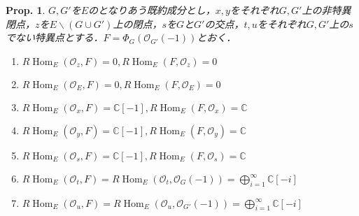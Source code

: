 \documentclass[uplatex,a4paper,11pt,dvipdfmx]{jsarticle}
\theoremstyle{mystyle} %
\newtheorem{proposition}[theorem]{Prop.}
\DeclareMathOperator{\Hom}{Hom}
\begin{document}
\begin{proposition}
	$G, G'$を$E$のとなりあう既約成分とし，$x,y$をそれぞれ$G, G'$上の非特異閉点，$z$を$E \backslash (G \cup G')$上の閉点，$s$を$G$と$G'$の交点，$t, u$をそれぞれ$G, G'$上の$s$でない特異点とする．$F = \Phi_G(\mathcal{O}_{G'}(-1))$とおく．
	\begin{enumerate}
		\item $R\Hom_E(\mathcal{O}_z, F) = 0, R\Hom_E(F,\mathcal{O}_z)=0$
		\item $R\Hom_E(\mathcal{O}_E, F) = 0, R\Hom_E(F,\mathcal{O}_E)=0$
		\item $R\Hom_E(\mathcal{O}_x, F) = \mathbb{C}[-1], R\Hom_E(F,\mathcal{O}_x)=\mathbb{C}$
		\item $R\Hom_E(\mathcal{O}_y, F) = \mathbb{C}[-1], R\Hom_E(F,\mathcal{O}_y)=\mathbb{C}$
		\item $R\Hom_E( \mathcal{O}_s, F) =\mathbb{C}[-1], R\Hom_E(F, \mathcal{O}_s) =\mathbb{C}$
		\item $R\Hom_E( \mathcal{O}_t, F) = R\Hom_E( \mathcal{O}_t, \mathcal{O}_G(-1)) = \bigoplus_{i=1}^\infty\mathbb{C}[-i]$
		\item $R\Hom_E(\mathcal{O}_u, F) = R\Hom_E( \mathcal{O}_u, \mathcal{O}_{G'}(-1)) = \bigoplus_{i=1}^\infty\mathbb{C}[-i]$
	\end{enumerate}
\end{proposition}
\end{document}
